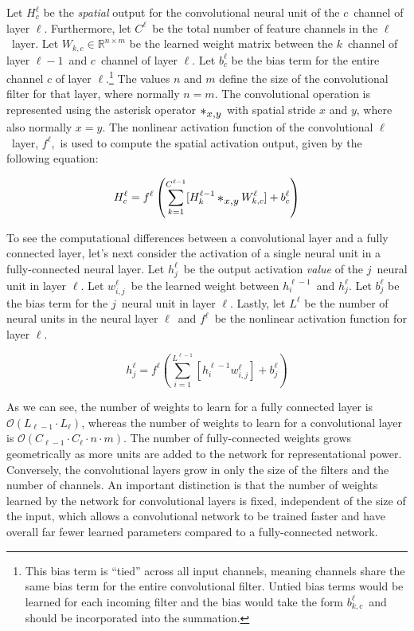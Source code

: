 Let $H_c^\ell$ be the \textit{spatial} output for the convolutional neural unit of the $c$\th\ channel of layer $\ell$.  Furthermore, let $C^{\ell}$\ be the total number of feature channels in the $\ell$\th\ layer.  Let $W_{k,c} \in \mathbb{R}^{n \times m}$ be the learned weight matrix between the $k$\th\ channel of layer $\ell - 1$\ and $c$\th\ channel of layer $\ell$.  Let $b_{c}^\ell$ be the bias term for the entire channel $c$ of layer $\ell$.\footnote{This bias term is ``tied'' across all input channels, meaning channels share the same bias term for the entire convolutional filter.  Untied bias terms would be learned for each incoming filter and the bias would take the form $b_{k,c}^\ell$\ and should be incorporated into the summation.}  The values $n$ and $m$ define the size of the convolutional filter for that layer, where normally $n = m$.  The convolutional operation is represented using the asterisk operator $\conv$ with spatial stride $x$ and $y$, where also normally $x = y$.  The nonlinear activation function of the convolutional $\ell$\ layer, $f^\ell$,\ is used to compute the spatial activation output, given by the following equation:

\begin{equation}
    \label{eq:convolution}
    H_c^\ell = f^\ell \left(\sum_{k=1}^{C^{\ell - 1}} [ H_k^{\ell-1} \conv W_{k,c}^\ell ] + b_{c}^\ell \right)
\end{equation}

To see the computational differences between a convolutional layer and a fully connected layer, let's next consider the activation of a single neural unit in a fully-connected neural layer.  Let $h_j^\ell$\ be the output activation \textit{value} of the $j$\th\ neural unit in layer $\ell$.  Let $w_{i,j}^\ell$\ be the learned weight between $h_i^{\ell - 1}$\ and $h_j^\ell$.  Let $b_j^\ell$ be the bias term for the $j$\th\ neural unit in layer $\ell$.  Lastly, let $L^{\ell}$ be the number of neural units in the neural layer $\ell$\ and $f^\ell$\ be the nonlinear activation function for layer $\ell$.

\begin{equation}
    \label{eq:fully-connected}
    h_j^\ell = f^\ell \left(\sum_{i=1}^{L^{\ell - 1}} [ h_i^{\ell - 1} w_{i,j}^\ell ] + b_j^\ell\right)
\end{equation}

As we can see, the number of weights to learn for a fully connected layer is $\mathcal{O}(L_{\ell - 1} \cdot L_{\ell})$, whereas the number of weights to learn for a convolutional layer is $\mathcal{O} (C_{\ell - 1} \cdot C_{\ell} \cdot n \cdot m)$.  The number of fully-connected weights grows geometrically as more units are added to the network for representational power.  Conversely, the convolutional layers grow in only the size of the filters and the number of channels.  An important distinction is that the number of weights learned by the network for convolutional layers is fixed, independent of the size of the input, which allows a convolutional network to be trained faster and have overall far fewer learned parameters compared to a fully-connected network.

